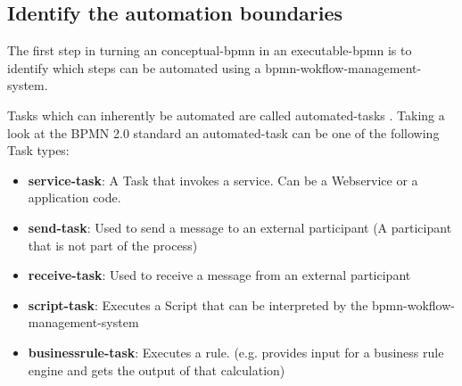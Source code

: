 \subsection{Identify the automation boundaries}\label{automation}
The first step in turning an \gls{conceptual-bpmn} in an  \gls{executable-bpmn} is to identify which steps can be automated using a \gls{bpmn-wokflow-management-system}. 

Tasks which can inherently be automated are called \gls{automated-task}s \cite[p.~317]{fundamentals}. Taking a look at the BPMN 2.0 standard an \gls{automated-task} can be one of the following Task types:
\begin{itemize}
	\item \textbf{\gls{service-task}}: A Task that invokes a service. Can be a Webservice or a application code.
	\item \textbf{\gls{send-task}}: Used to send a message to an external participant (A participant that is not part of the process)
	\item \textbf{\gls{receive-task}}: Used to receive a message from an external participant
	\item \textbf{\gls{script-task}}: Executes a Script that can be interpreted by the \gls{bpmn-wokflow-management-system}
	\item \textbf{\gls{businessrule-task}}: Executes a rule. (e.g. provides input for a business rule engine and gets the output of that calculation)
\end{itemize}


